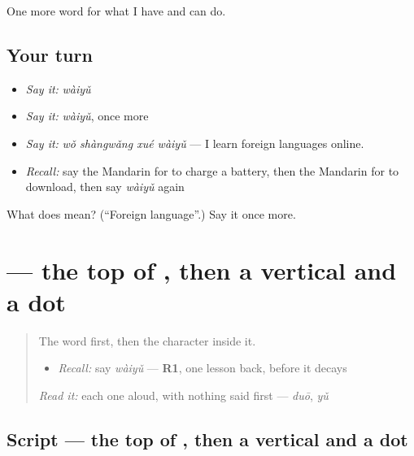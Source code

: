 \begin{grammarlens}[title={What you've built}]
One more word for what I have and can do.
\end{grammarlens}

\subsection*{Your turn}
\begin{itemize}
\raggedright
  \item \emph{Say it:} \emph{wàiyǔ}
  \item \emph{Say it:} \emph{wàiyǔ}, once more
  \item \emph{Say it:} \emph{wǒ shàngwǎng xué wàiyǔ} — I learn foreign languages online.
  \item \emph{Recall:} say the Mandarin for to charge a battery, then the Mandarin for to download, then say \emph{wàiyǔ} again
\end{itemize}

\begin{tcolorbox}[breakable,colback=teal!4,colframe=teal!35!black,title={Before you move on}]
What does  mean? (\textquotedblleft{}Foreign language\textquotedblright{}.) Say it once more.
\end{tcolorbox}
\section[\texorpdfstring{\zh{外} (wài)}{外 (wài)}]{ — the top of , then a vertical and a dot}

\label{lesson:ZH-W110-wai}



\begin{quote}
The word first, then the character inside it.

\begin{itemize}
\raggedright
  \item \emph{Recall:} say \emph{wàiyǔ} — \textbf{R1}, one lesson back, before it decays
\end{itemize}

\begin{quote}
 
\end{quote}

\emph{Read it:} each one aloud, with nothing said first — \emph{duō}, \emph{yǔ}
\end{quote}

\subsection*{Script — the top of , then a vertical and a dot}

